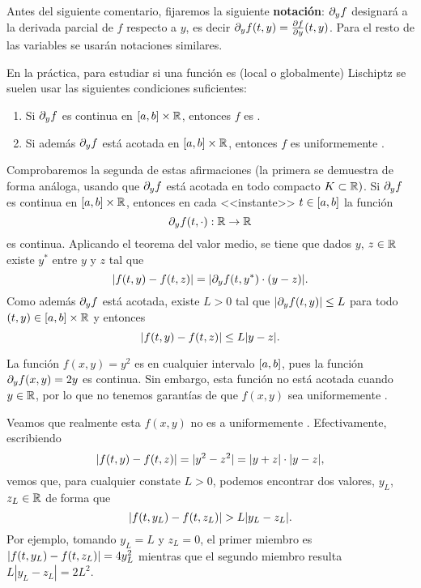 Antes del siguiente comentario, fijaremos la siguiente
\textbf{notación}: $\dy f$ designará a la derivada parcial de $f$
respecto a $y$, es decir $\dy f(\tt,y) = \frac{\partial f}{\partial
  \yy}(\tt,y)$. Para el resto de las variables se usarán notaciones
similares.
\begin{remark}
  En la práctica, para estudiar si una función es (local o
  globalmente) Lischiptz se suelen usar las siguientes condiciones
  suficientes:
  \begin{enumerate}
  \item Si $\dy f$ es continua en $[\ta,\tb]\times\Rset$, entonces $f$
    es \locLischiptz.
  \item Si además $\dy f$ está acotada en
    $[\ta,\tb]\times\Rset$, entonces $f$ es uniformemente
    \lischiptz.
  \end{enumerate}
  Comprobaremos la segunda de estas afirmaciones (la primera se
  demuestra de forma análoga, usando que $\dy f$ está acotada
  en todo compacto $K\subset\Rset)$.
  Si $\dy f$ es continua en $[\ta,\tb]\times\Rset$, entonces en cada
  <<instante>> $t\in[\ta,\tb]$ la función
  $$\dy f(t,\cdot):\Rset \to \Rset$$
  es continua. Aplicando el teorema del valor medio, se tiene que
  dados $y$, $z\in\Rset$ existe $y^*$ entre $y$ y $z$ tal que
  \begin{equation*}
    |f(\tt,y)-f(\tt,z)| = |\dy f(\tt,y^*) \cdot (y-z)|.
  \end{equation*}
  Como además  $\dy f$ está acotada, existe $L>0$ tal que $|\dy
  f(\tt,y)|\le L$ para todo $(\tt,y)\in [\ta,\tb]\times\Rset$ y
  entonces 
  \begin{equation*}
    |f(\tt,y) - f(\tt,z)| \le L |y-z|.
  \end{equation*}
\end{remark}

\begin{example}
  La función $f(x,y)=y^2$ es \locLischiptz en cualquier intervalo
  $[\ta,\tb]$, pues la función $\dy f(x,y)=2y$ es continua. Sin
  embargo, esta función no está acotada cuando $y\in\Rset$, por lo que
  no tenemos garantías de que $f(x,y)$ sea uniformemente \lischiptz.
  
  Veamos que realmente esta $f(x,y)$ no es a uniformemente
  \lischiptz. Efectivamente, escribiendo
  \begin{equation*}
    |f(\tt,y)-f(\tt,z)| = |y^2-z^2| =  |y+z| \cdot |y-z|,
  \end{equation*}
  vemos que, para cualquier constate $L>0$, podemos encontrar dos
  valores, $y_L$, $z_L\in\Rset$ de forma que
  \begin{equation*}
  |f(\tt,y_L)-f(\tt,z_L)| >  L  |y_L-z_L|.
 \end{equation*}
 Por ejemplo, tomando $y_L=L$ y $z_L=0$, el primer miembro es
 $|f(\tt,y_L)-f(\tt,z_L)|=4y_L^2$ mientras que el segundo miembro resulta
 $L|y_L-z_L|=2L^2$.
\end{example}

